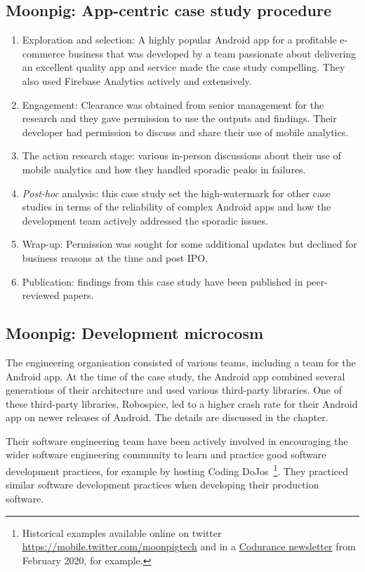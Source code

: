 \subsection{Moonpig: App-centric case study procedure}
{\small
\begin{enumerate}
    \itemsep0em
    \item Exploration and selection: A highly popular Android app for a profitable e-commerce business that was developed by a team passionate about delivering an excellent quality app and service made the case study compelling. They also used Firebase Analytics actively and extensively. 
    \item Engagement: Clearance was obtained from senior management for the research and they gave permission to use the outputs and findings. Their developer had permission to discuss and share their use of mobile analytics. 
    \item The action research stage: various in-person discussions about their use of mobile analytics and how they handled sporadic peaks in failures.
    \item \textit{Post-hoc} analysis: this case study set the high-watermark for other case studies in terms of the reliability of complex Android apps and how the development team actively addressed the sporadic issues. 
    \item Wrap-up: Permission was sought for some additional updates but declined for business reasons at the time and post IPO.
    \item Publication: findings from this case study have been published in peer-reviewed papers.
\end{enumerate}
}


\subsection{Moonpig: Development microcosm}
The engineering organisation consisted of various teams, including a team for the Android app. At the time of the case study, the Android app combined several generations of their architecture and used various third-party libraries. One of these third-party libraries, Robospice, led to a higher crash rate for their Android app on newer releases of Android. The details are discussed in the  chapter.

Their software engineering team have been actively involved in encouraging the wider software engineering community to learn and practice good software development practices, for example by hosting Coding DoJos~\footnote{Historical examples available online on twitter \url{https://mobile.twitter.com/moonpigtech} and in a \href{https://www.codurance.com/publications/newsletters/2020-02-13-newsletter}{Codurance newsletter} from February 2020, for example.}. They practiced similar software development practices when developing their production software.

